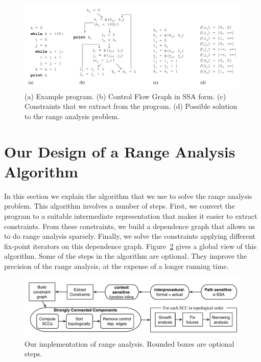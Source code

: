 \documentclass[preprint]{elsarticle}
\begin{document}
\begin{figure}[t!]
\begin{center}
\includegraphics[width=1\textwidth]{images/ex1}
\end{center}
\caption{\label{fig:ex1}
(a) Example program.
(b) Control Flow Graph in SSA form.
(c) Constraints that we extract from the program.
(d) Possible solution to the range analysis problem.}
\end{figure}

\section{Our Design of a Range Analysis Algorithm}
\label{sec:algo}


In this section we explain the algorithm that we use to solve the range
analysis problem.
This algorithm involves a number of steps.
First, we convert the program to a suitable intermediate representation that
makes it easier to extract constraints.
From these constraints, we build a dependence graph that allows us to do
range analysis sparsely.
Finally, we solve the constraints applying different fix-point iterators on
this dependence graph.
Figure~\ref{fig:algorithm} gives a global view of this algorithm.
Some of the steps in the algorithm are optional.
They improve the precision of the range analysis, at the expense of a longer
running time.

\begin{figure}[t!]
\begin{center}
\includegraphics[width=1\textwidth]{images/algorithm}
\end{center}
\caption{\label{fig:algorithm}
Our implementation of range analysis.
Rounded boxes are optional steps.}
\end{figure}
\end{document}
